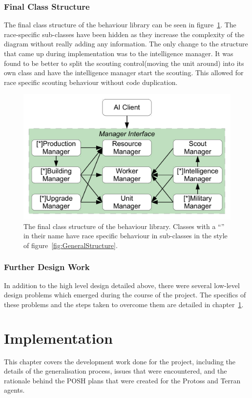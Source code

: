 \documentclass[11pt,openright,a4paper]{report}
\begin{document}
\subsection{Final Class Structure}
The final class structure of the behaviour library can be seen in figure~\ref{fig:ClassDia}. The race-specific sub-classes have been hidden as they increase the complexity of the diagram without really adding any information. The only change to the structure that came up during implementation was to the intelligence manager. It was found to be better to split the scouting control(moving the unit around) into its own class and have the intelligence manager start the scouting. This allowed for race specific scouting behaviour without code duplication.
\begin{figure}[h]
    \centering
    \includegraphics[scale=0.5]{ClassDia}
    \caption{The final class structure of the behaviour library. Classes with a ``\lbrack*\rbrack'' in their name have race specific behaviour in sub-classes in the style of figure~\ref{fig:GeneralStructure}.}
    \label{fig:ClassDia}
\end{figure}

\subsection{Further Design Work}
In addition to the high level design detailed above, there were several low-level design problems which emerged during the course of the project. The specifics of these problems and the steps taken to overcome them are detailed in chapter~\ref{Implementation}.

\chapter{Implementation}
\label{Implementation}
This chapter covers the development work done for the project, including the details of the generalisation process, issues that were encountered, and the rationale behind the POSH plans that were created for the Protoss and Terran agents.
\end{document}
